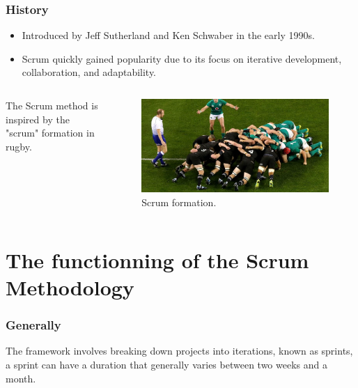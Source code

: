 \documentclass[
	11pt, %
]{beamer}
\begin{document}
\begin{frame}

	\frametitle{History}

	\begin{itemize}
		\item Introduced by Jeff Sutherland and Ken Schwaber  in the early 1990s.
		\item  Scrum quickly gained popularity due to its focus on iterative development, collaboration, and adaptability.
	\end{itemize}

	\begin{columns}[c] %
		\begin{column}{0.45\textwidth} %
			The Scrum method is inspired by the "scrum" formation in rugby.
		\end{column}
		\begin{column}{0.5\textwidth} %
			\begin{figure}
				\includegraphics[width=0.8\linewidth]{scrum.jpg}
				\caption{Scrum formation.}
			\end{figure}
		\end{column}
	\end{columns}

\end{frame}


\section{The functionning of the Scrum Methodology}

\begin{frame}
	\frametitle{Generally}
	The framework involves breaking down projects into iterations,
	known as sprints,  a sprint can have a duration
	that generally varies between two weeks and a month.
\end{frame}
\end{document}
